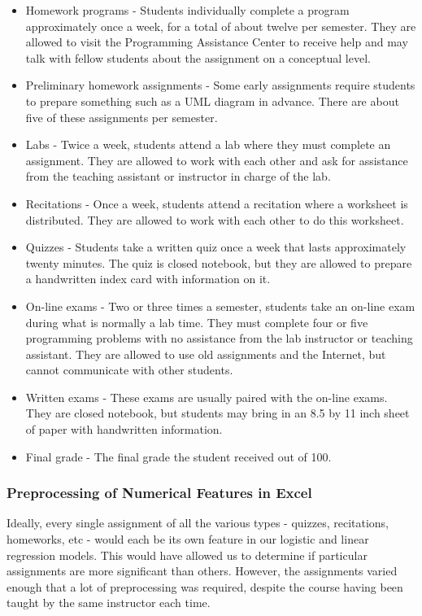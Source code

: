 \documentclass[letterpaper,11pt]{article}
\begin{document}
    \begin{itemize}
    \item Homework programs - Students individually complete a program approximately once a week, for a total of about twelve per semester.  They are allowed to visit the Programming Assistance Center to receive help and may talk with fellow students about the assignment on a conceptual level.
    \item Preliminary homework assignments - Some early assignments require students to prepare something such as a UML diagram in advance.  There are about five of these assignments per semester.
    \item Labs - Twice a week, students attend a lab where they must complete an assignment.  They are allowed to work with each other and ask for assistance from the teaching assistant or instructor in charge of the lab.
    \item Recitations - Once a week, students attend a recitation where a worksheet is distributed.  They are allowed to work with each other to do this worksheet.
    \item Quizzes - Students take a written quiz once a week that lasts approximately twenty minutes.  The quiz is closed notebook, but they are allowed to prepare a handwritten index card with information on it.
    \item On-line exams - Two or three times a semester, students take an on-line exam during what is normally a lab time.  They must complete four or five programming problems with no assistance from the lab instructor or teaching assistant.  They are allowed to use old assignments and the Internet, but cannot communicate with other students.
    \item Written exams - These exams are usually paired with the on-line exams.  They are closed notebook, but students may bring in an 8.5 by 11 inch sheet of paper with handwritten information.
    \item Final grade - The final grade the student received out of 100.
    \end{itemize}

\subsubsection{Preprocessing of Numerical Features in Excel}

Ideally, every single assignment of all the various types - quizzes, recitations, homeworks, etc - would each be its own feature in our logistic and linear regression models.  This would have allowed us to determine if particular assignments are more significant than others.  However, the assignments varied enough that a lot of preprocessing was required, despite the course having been taught by the same instructor each time.
\end{document}
